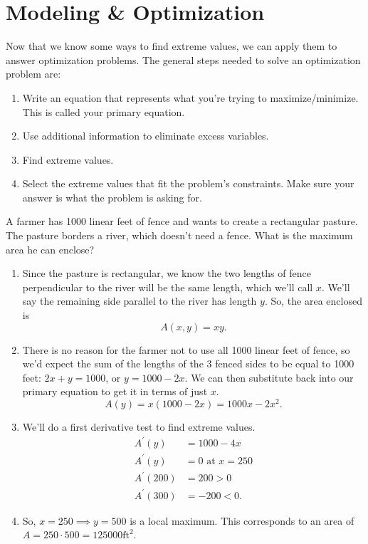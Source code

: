 \section{Modeling \& Optimization}
Now that we know some ways to find extreme values, we can apply them to answer optimization problems.
The general steps needed to solve an optimization problem are:
\begin{enumerate}
	\item Write an equation that represents what you're trying to maximize/minimize. This is called your primary equation.
	\item Use additional information to eliminate excess variables.
	\item Find extreme values.
	\item Select the extreme values that fit the problem's constraints. Make sure your answer is what the problem is asking for.
\end{enumerate}

\begin{example}
	A farmer has 1000 linear feet of fence and wants to create a rectangular pasture.
	The pasture borders a river, which doesn't need a fence.
	What is the maximum area he can enclose?
\end{example}
\begin{answer}
	\begin{enumerate}
		\item Since the pasture is rectangular, we know the two lengths of fence perpendicular to the river will be the same length, which we'll call $x$.
			We'll say the remaining side parallel to the river has length $y$.
			So, the area enclosed is
			\begin{equation*}
				A(x,y) = xy.
			\end{equation*}
		\item There is no reason for the farmer not to use all 1000 linear feet of fence, so we'd expect the sum of the lengths of the 3 fenced sides to be equal to 1000 feet: $2x + y = 1000$, or $y = 1000 - 2x$.
			We can then substitute back into our primary equation to get it in terms of just $x$.
			\begin{equation*}
				A(y) = x(1000-2x) = 1000x - 2x^2.
			\end{equation*}
		\item We'll do a first derivative test to find extreme values.
		\begin{align*}
			A^\prime(y) &= 1000 - 4x \\
			A^\prime(y) &= 0 \text{ at } x = 250 \\
			A^\prime(200) &= 200 > 0 \\
			A^\prime(300) &= -200 < 0.
		\end{align*}
		\item So, $x=250 \implies y = 500$ is a local maximum.
			This corresponds to an area of $A = 250\cdot 500 = 125000\text{ft}^2$.
	\end{enumerate}
\end{answer}

